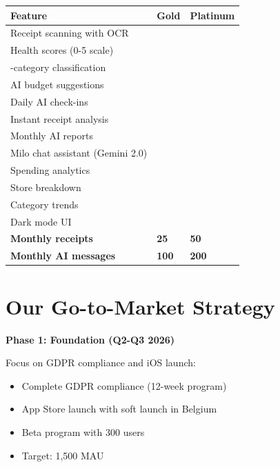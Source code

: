 \documentclass[11pt,a4paper]{report}
\newcommand{\cmark}{\textcolor{successgreen}{\ding{51}}}
\begin{document}
\begin{center}
\renewcommand{\arraystretch}{1.4}
\begin{tabular}{>{\raggedright\arraybackslash}p{6cm} >{\centering\arraybackslash}p{3cm} >{\centering\arraybackslash}p{3cm}}
\toprule
\rowcolor{miloprimary!15}
\textbf{Feature} & \textbf{Gold} & \textbf{Platinum} \\
\midrule
Receipt scanning with OCR & \cmark & \cmark \\
\rowcolor{lightbg}
Health scores (0-5 scale) & \cmark & \cmark \\
17-category classification & \cmark & \cmark \\
\rowcolor{lightbg}
AI budget suggestions & \cmark & \cmark \\
Daily AI check-ins & \cmark & \cmark \\
\rowcolor{lightbg}
Instant receipt analysis & \cmark & \cmark \\
Monthly AI reports & \cmark & \cmark \\
\rowcolor{lightbg}
Milo chat assistant (Gemini 2.0) & \cmark & \cmark \\
Spending analytics & \cmark & \cmark \\
\rowcolor{lightbg}
Store breakdown & \cmark & \cmark \\
Category trends & \cmark & \cmark \\
\rowcolor{lightbg}
Dark mode UI & \cmark & \cmark \\
\textbf{Monthly receipts} & \textbf{25} & \textbf{50} \\
\rowcolor{lightbg}
\textbf{Monthly AI messages} & \textbf{100} & \textbf{200} \\
\bottomrule
\end{tabular}
\end{center}

\section{Our Go-to-Market Strategy}

\textbf{Phase 1: Foundation (Q2-Q3 2026)}

Focus on GDPR compliance and iOS launch:
\begin{itemize}[leftmargin=2em, itemsep=3pt]
    \item Complete GDPR compliance (12-week program)
    \item App Store launch with soft launch in Belgium
    \item Beta program with 300 users
    \item Target: 1,500 MAU
\end{itemize}
\end{document}
